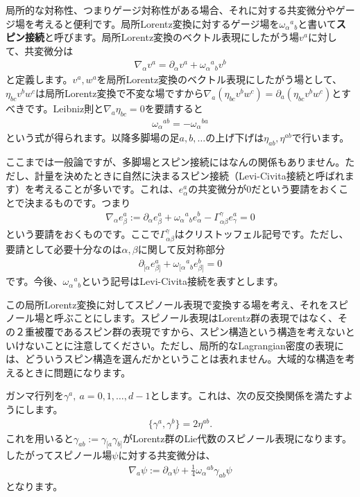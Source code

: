 \documentclass[report,paper=a4, fontsize=12pt, line_length=16cm, number_of_lines=34,dvipdfmx]{jlreq}
\numberwithin{equation}{chapter}
\numberwithin{equation}{section}
\newcommand{\del}{\partial}
\newcommand{\kyou}[1]{{\sffamily \bfseries #1}}
\begin{document}
局所的な対称性、つまりゲージ対称性がある場合、それに対する共変微分やゲージ場を考えると便利です。局所Lorentz変換に対するゲージ場を$\omega_{\alpha}{}^{a}{}_{b}$と書いて\kyou{スピン接続}と呼びます。局所Lorentz変換のベクトル表現にしたがう場$v^{a}$に対して、共変微分は
\begin{align}
  \nabla_{\alpha}v^{a}=\del_{\alpha}v^{a}+\omega_{\alpha}{}^{a}{}_{b}v^{b}
\end{align}
と定義します。$v^{a},w^{a}$を局所Lorentz変換のベクトル表現にしたがう場として、$\eta_{bc}v^{b}w^{c}$は局所Lorentz変換で不変な場ですから$\nabla_{a}(\eta_{bc}v^{b}w^{c})=\del_{a}(\eta_{bc}v^{b}w^{c})$とすべきです。Leibniz則と$\nabla_{a}\eta_{bc}=0$を要請すると
\begin{align}
  \omega_{\alpha}{}^{ab}
  =-\omega_{\alpha}{}^{ba}
\end{align}
という式が得られます。以降多脚場の足$a,b,\dots$の上げ下げは$\eta_{ab},\eta^{ab}$で行います。

ここまでは一般論ですが、多脚場とスピン接続にはなんの関係もありません。ただし、計量を決めたときに自然に決まるスピン接続（Levi-Civita接続と呼ばれます）を考えることが多いです。これは、$e^{a}_{\alpha}$の共変微分が$0$だという要請をおくことで決まるものです。つまり
\begin{align}
  \nabla_{\alpha}e^{a}_{\beta}:=\del_{\alpha}e^{a}_{\beta}+\omega_{\alpha}{}^{a}{}_{b}e^{b}_{\alpha}-\Gamma^{\gamma}_{\alpha\beta}e^{a}_{\gamma}=0
\end{align}
という要請をおくものです。ここで$\Gamma^{\gamma}_{\alpha\beta}$はクリストッフェル記号です。ただし、要請として必要十分なのは$\alpha,\beta$に関して反対称部分
\begin{align}
  \del_{[\alpha}e^{a}_{\beta]}+\omega_{[\alpha}{}^{a}{}_{b}e^{b}_{\beta]}=0
\end{align}
です。今後、$\omega_{\alpha}{}^{a}{}_{b}$という記号はLevi-Civita接続を表すとします。

この局所Lorentz変換に対してスピノール表現で変換する場を考え、それをスピノール場と呼ぶことにします。スピノール表現はLorentz群の表現ではなく、その２重被覆であるスピン群の表現ですから、スピン構造という構造を考えないといけないことに注意してください。ただし、局所的なLagrangian密度の表現には、どういうスピン構造を選んだかということは表れません。大域的な構造を考えるときに問題になります。

ガンマ行列を$\gamma^{a},\ a=0,1,\dots,d-1$とします。これは、次の反交換関係を満たすようにします。
\begin{align}
  \{\gamma^{a},\gamma^{b}\}=2\eta^{ab}.
\end{align}
これを用いると$\gamma_{ab}:=\gamma_{[a}\gamma_{b]}$がLorentz群のLie代数のスピノール表現になります。したがってスピノール場$\psi$に対する共変微分は、
\begin{align}
  \nabla_{a}\psi:=\del_{\alpha}\psi+\frac14\omega_{\alpha}{}^{ab}\gamma_{ab}\psi
\end{align}
となります。
\end{document}
